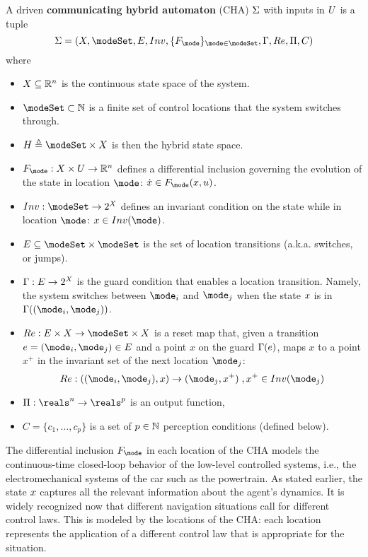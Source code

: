 \begin{defn}
	\label{def:CHA}
A driven \textbf{communicating hybrid automaton} (CHA) $\Sigma$ with inputs in $U$ 
is a tuple 
\[\Sys = (\stSet, \modeSet, E, Inv, \{F_\mode\}_{\mode \in \modeSet}, \guard, \reset, \funcOut, C)\]
where 
\begin{itemize}
	\item $X \subseteq \mathbb{R}^n$ is the continuous state space of the system.
	\item $\modeSet \subset \Ne$ is a finite set of control locations that the system switches through. 
	\item $\hsSet \triangleq \modeSet \times \stSet$ is then the hybrid state space.
	\item $F_\mode : \stSet \times \inpSet \rightarrow \Re^n$ defines a differential inclusion governing the evolution of the state in location $\mode$: $\dot{\stPt} \in F_\mode(\stPt,u)$. 
	\item $Inv : \modeSet \rightarrow 2^\stSet$ defines an invariant condition on the state while in location $\mode$: $\stPt \in Inv(\mode)$.
	\item $E \subseteq \modeSet \times \modeSet$ is the set of location transitions (a.k.a. switches, or jumps).
	\item $\Gamma : E \rightarrow 2^X$ is the guard condition that enables a location transition. 
	Namely, the system switches between $\mode _i$ and $\mode _j$ when the state $x$ is in $\guard((\mode_i,\mode _j))$.
	\item $\reset : E \times \stSet \rightarrow \modeSet \times \stSet $ is a reset map that, given a transition $e = (\mode _i,\mode _j) \in E$ and a point $x$ on the guard $\Gamma(e)$, maps $x$ to a point $x^+$ in the invariant set of the next location $\mode_j$:
	\[\reset: ((\mode _i,\mode _j),x) \rightarrow (\mode_j,x^+)\;, x^+ \in Inv(\mode_j)\] 
	\item $\funcOut: \reals^n \rightarrow \reals^p$ is an output function,
	\item $C = \{c_1,\ldots,c_p\}$ is a set of $p \in \mathbb{N}$ perception conditions (defined below).	
\end{itemize}
\end{defn}

The differential inclusion $F_\mode$ in each location of the CHA models the continuous-time closed-loop behavior of the low-level controlled systems, i.e., the electromechanical systems of the car such as the powertrain.
As stated earlier, the state $x$ captures all the relevant information about the agent's dynamics. 
It is widely recognized now that different navigation situations call for different control laws.
This is modeled by the locations of the CHA: each location represents the application of a different control law that is appropriate for the situation.

